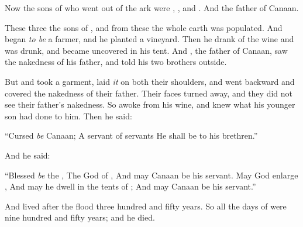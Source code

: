 
\bverse Now the sons of  who went out of the ark were , , and . And  \was the father of Canaan.

\bverse These three  the sons of , and from these the whole earth was populated.
\bverse And  began \textit{to be} a farmer, and he planted a vineyard.
\bverse Then he drank of the wine and was drunk, and became uncovered in his tent.
\bverse And , the father of Canaan, saw the nakedness of his father, and told his two brothers outside.

\bverse But  and  took a garment, laid \textit{it} on both their shoulders, and went backward and covered the nakedness of their father. Their faces \were turned away, and they did not see their father's nakedness.
\bverse So  awoke from his wine, and knew what his younger son had done to him.
\bverse Then he said:
\begin{bquotation}
``Cursed \textit{be} Canaan; A servant of servants He shall be to his brethren.''
\end{bquotation}
\bverse And he said:
\begin{bquotation}
``Blessed \textit{be} the \lord, The God of , And may Canaan be his servant.
\bverse May God enlarge , And may he dwell in the tents of ; And may Canaan be his servant.''
\end{bquotation}

\bverse And  lived after the flood three hundred and fifty years.
\bverse So all the days of  were nine hundred and fifty years; and he died.
	
	
